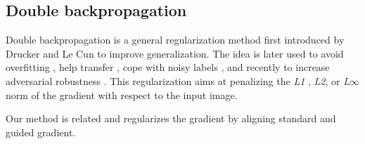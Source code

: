 





\subsection{Double backpropagation}
Double backpropagation is a general regularization method first introduced by Drucker and Le Cun \cite{drucker1991double} to improve generalization.
The idea is later used to avoid overfitting \cite{philipp2018nonlinearity}, help transfer \cite{srinivas2018knowledge}, cope with noisy labels \cite{luo2019simple}, and recently to increase adversarial robustness \cite{lyu2015unified,simon2018adversarial,ross2018improving,seck20191,finlay2018improved}.
This regularization aims at penalizing the \emph{L1} \cite{seck20191}, \emph{L2}, or \emph{L$\infty$} norm of the gradient with respect to the input image.

Our method is related and regularizes the gradient by aligning standard and guided gradient.




%
%
%
%
%
%
%
%

